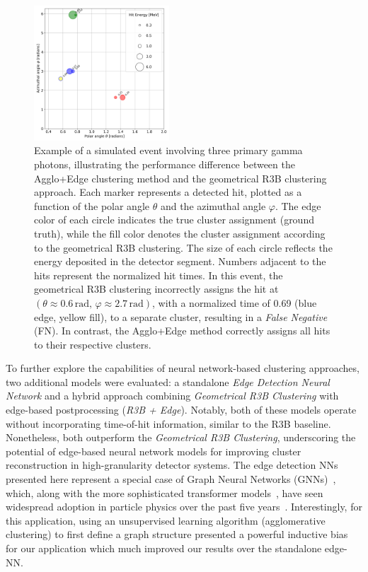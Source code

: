 \documentclass[final,5p,times,twocolumn]{elsarticle}
\begin{document}
\begin{figure}[!htb]
        \centering
        \includegraphics[width=0.45\textwidth]{example_event_9114.png}
	    \caption{Example of a simulated event involving three primary gamma photons, illustrating the performance difference between the Agglo+Edge clustering method and the geometrical R3B clustering approach. Each marker represents a detected hit, plotted as a function of the polar angle \(\theta\) and the azimuthal angle \(\varphi\). The edge color of each circle indicates the true cluster assignment (ground truth), while the fill color denotes the cluster assignment according to the geometrical R3B clustering. The size of each circle reflects the energy deposited in the detector segment. Numbers adjacent to the hits represent the normalized hit times. In this event, the geometrical R3B clustering incorrectly assigns the hit at \((\theta \approx 0.6\,\mathrm{rad},\, \varphi \approx 2.7\,\mathrm{rad})\), with a normalized time of 0.69 (blue edge, yellow fill), to a separate cluster, resulting in a \textit{False Negative} (FN). In contrast, the Agglo+Edge method correctly assigns all hits to their respective clusters.}
        \label{fig:comparison_r3b_agglo_edge}%
\end{figure}

To further explore the capabilities of neural network-based clustering approaches, two additional models were evaluated: a standalone \textit{Edge Detection Neural Network} and a hybrid approach combining \textit{Geometrical R3B Clustering} with edge-based postprocessing (\textit{R3B + Edge}). Notably, both of these models operate without incorporating time-of-hit information, similar to the R3B baseline. Nonetheless, both outperform the \textit{Geometrical R3B Clustering}, underscoring the potential of edge-based neural network models for improving cluster reconstruction in high-granularity detector systems.\newline
The edge detection NNs presented here represent a special case of Graph Neural Networks (GNNs)~\cite{battaglia2018relational}, which, along with the more sophisticated transformer models~\cite{vaswani2017attention,amatriain2023transformer}, have seen widespread adoption in particle physics over the past five years~\cite{dezoort2021charged,ju2021performance,van2024transformers}. Interestingly, for this application, using an unsupervised learning algorithm (agglomerative clustering) to first define a graph structure presented a powerful inductive bias for our application which much improved our results over the standalone edge-NN.
\end{document}
